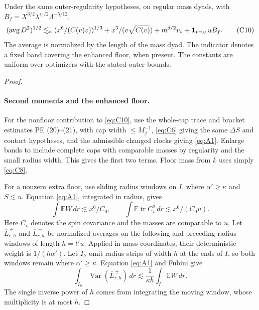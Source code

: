 \begin{lemma}\label{bud:outer-second}
Under the same outer-regularity hypotheses, on regular mass dyads, with
$B_f=X^{3/2}\lambda^{s_0/2}\Lambda^{-5/12}$,
\[
 (\operatorname{avg}D^2)^{1/2}
 \lesssim_\circ (x^6/(C(v)v))^{1/3}+x^3/(v\sqrt{C(v)})
            +m^{\delta/2}v_*+{\bf1}_{v\asymp u}\,u B_f .               \tag{C10}\label{eq:C10}
\]
The average is normalized by the length of the mass dyad. The indicator
denotes a fixed band covering the enhanced floor, when present. The
constants are uniform over optimizers with the stated outer bounds.
\end{lemma}
\begin{proof}
\leavevmode\par
\paragraph{Second moments and the enhanced floor.}

For the nonfloor contribution to \eqref{eq:C10}, use the whole-cap trace and bracket estimates PE (20)--(21), with cap width \(\le M_j^{-1}\), \eqref{eq:C6} giving the same \(\Delta S\) and contact hypotheses, and the admissible changed clocks giving \eqref{eq:A1}. Enlarge bands to include complete caps with comparable masses by regularity and the small radius width. This gives the first two terms. Floor mass from \(k\) uses simply \eqref{eq:C8}.

For a nonzero extra floor, use sliding radius windows on \(I\), where
\(\alpha'\ge\kappa\) and \(S\lesssim u\). Equation
\eqref{eq:A1}, integrated in radius, gives
\[
 \int\mathbb EW\,dr\lesssim x^6/C_0,
 \qquad
 \int\mathbb E\operatorname{tr}C_v^2\,dr
       \lesssim x^6/(C_0u).
\]
Here \(C_v\) denotes the spin covariance and the masses are comparable
to \(u\). Let \(\overline L^{\,+}_{r,h}\) and
\(\overline L^{\,-}_{r,h}\) be normalized averages on the following
and preceding radius windows of length \(h=t'u\). Applied in mass
coordinates, their deterministic weight is \(1/(h\alpha')\).
Let \(I_h\) omit radius strips of width \(h\) at the ends of \(I\),
so both windows remain where \(\alpha'\ge\kappa\).
Equation \eqref{eq:A1} and Fubini give
\[
 \int_{I_h}\operatorname{Var}(\overline L^{\,\pm}_{r,h})\,dr
 \lesssim\frac1{\kappa h}\int_I\mathbb EW\,dr.
\]
The single inverse power of \(h\) comes from integrating the moving
window, whose multiplicity is at most \(h\).


\end{proof}
